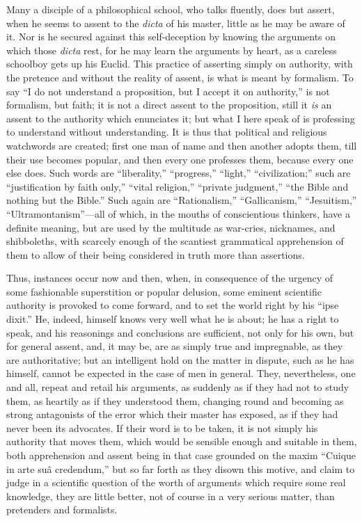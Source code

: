 Many a disciple of a philosophical school, who talks fluently, does
but assert, when he seems to assent to the \emph{dicta} of his master,
little as he may be aware of it. Nor is he secured against this
self-deception by knowing the arguments on which those \emph{dicta}
rest, for he may learn the arguments by heart, as a careless schoolboy
gets up his Euclid. This practice of asserting simply on authority,
with the pretence and without the reality of assent, is what is meant
by formalism. To say ``I do not understand a proposition, but I
accept it on authority,'' is not formalism, but faith; it is not a
direct assent to the proposition, still it \emph{is} an assent to the
authority which enunciates it; but what I here speak of is professing
to understand without understanding. It is thus that political and
religious watchwords are created; first one man of name and then
another adopts them, till their use becomes popular, and then
every one professes them, because every one else does. Such words are
``liberality,'' ``progress,'' ``light,''
``civilization;'' such are ``justification by faith
only,'' ``vital religion,'' ``private judgment,''
``the Bible and nothing but the Bible.'' Such again are
``Rationalism,'' ``Gallicanism,''
``Jesuitism,'' ``Ultramontanism''—all of which, in
the mouths of conscientious thinkers, have a definite meaning, but are
used by the multitude as war-cries, nicknames, and shibboleths, with
scarcely enough of the scantiest grammatical apprehension of them to
allow of their being considered in truth more than assertions.

Thus, instances occur now and then, when, in consequence of the
urgency of some fashionable superstition or popular delusion, some
eminent scientific authority is provoked to come forward, and to set
the world right by his ``ipse dixit.'' He, indeed, himself
knows very well what he is about; he has a right to speak, and his
reasonings and conclusions are sufficient, not only for his own, but
for general assent, and, it may be, are as simply true and
impregnable, as they are authoritative; but an intelligent hold on the
matter in dispute, such as he has himself, cannot be expected in the
case of men in general. They, nevertheless, one and all, repeat and
retail his arguments, as suddenly as if they had not to study them, as
heartily as if they understood them, changing round and becoming as
strong antagonists of the error which their master has exposed, as if
they had never been its advocates. If their word is to be taken, it is
not simply his authority that moves them, which would be sensible
enough and suitable in them, both apprehension and assent being
in that case grounded on the maxim ``Cuique in arte suâ
credendum,'' but so far forth as they disown this motive, and
claim to judge in a scientific question of the worth of arguments
which require some real knowledge, they are little better, not of
course in a very serious matter, than pretenders and formalists.

